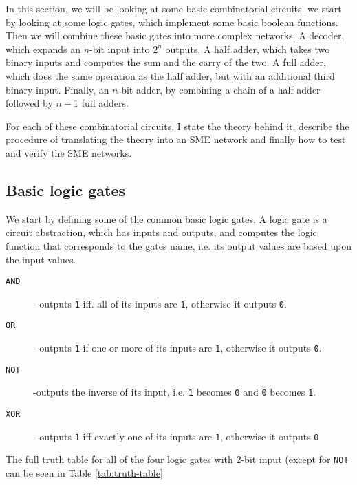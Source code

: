 In this section, we will be looking at some basic combinatorial circuits. we
start by looking at some logic gates, which implement some basic boolean
functions. Then we will combine these basic gates into more complex networks: A
decoder, which expands an $n$-bit input into $2^n$ outputs. A half adder, which
takes two binary inputs and computes the sum and the carry of the two. A full
adder, which does the same operation as the half adder, but with an additional
third binary input. Finally, an $n$-bit adder, by combining a chain of a half
adder followed by $n-1$ full adders.

For each of these combinatorial circuits, I state the theory behind it,
describe the procedure of translating the theory into an SME network and
finally how to test and verify the SME networks.

\subsection{Basic logic gates}
We start by defining some of the common basic logic gates.  A logic gate is a
circuit abstraction, which has inputs and outputs, and computes the logic
function that corresponds to the gates name, i.e. its output values are based
upon the input values.

\begin{description}
    \item[\texttt{AND}] - outputs \texttt{1} iff. all of its inputs are
        \texttt{1}, otherwise it outputs \texttt{0}.

    \item[\texttt{OR}] - outputs \texttt{1} if one or more of its inputs are
        \texttt{1}, otherwise it outputs \texttt{0}.

    \item[\texttt{NOT}] -outputs the inverse of its input, i.e. \texttt{1}
        becomes \texttt{0} and \texttt{0} becomes \texttt{1}.

    \item[\texttt{XOR}] - outputs \texttt{1} iff exactly one of its inputs are
        \texttt{1}, otherwise it outputs \texttt{0}
\end{description}
The full truth table for all of the four logic gates with 2-bit input (except
for \texttt{NOT} can be seen in Table \ref{tab:truth-table}

